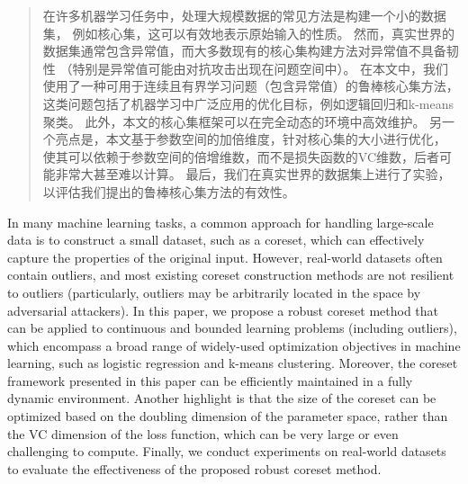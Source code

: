 

\begin{abstract}
  在许多机器学习任务中，处理大规模数据的常见方法是构建一个小的数据集，
  例如核心集，这可以有效地表示原始输入的性质。
  然而，真实世界的数据集通常包含异常值，而大多数现有的核心集构建方法对异常值不具备韧性
  （特别是异常值可能由对抗攻击出现在问题空间中）。
  在本文中，我们使用了一种可用于连续且有界学习问题（包含异常值）的鲁棒核心集方法，
  这类问题包括了机器学习中广泛应用的优化目标，例如逻辑回归和k-means聚类。
  此外，本文的核心集框架可以在完全动态的环境中高效维护。
  另一个亮点是，本文基于参数空间的加倍维度，针对核心集的大小进行优化，
  使其可以依赖于参数空间的倍增维数，而不是损失函数的VC维数，后者可能非常大甚至难以计算。
  最后，我们在真实世界的数据集上进行了实验，以评估我们提出的鲁棒核心集方法的有效性。
\end{abstract}

\begin{abstract*}
  In many machine learning tasks, a common approach for handling large-scale data is to construct a small dataset, 
  such as a coreset, which can effectively capture the properties of the original input. However, 
  real-world datasets often contain outliers, and most existing coreset construction methods 
  are not resilient to outliers (particularly, outliers may be arbitrarily located in the space by adversarial 
  attackers). In this paper, we propose a robust coreset method that can be applied to continuous and 
  bounded learning problems (including outliers), which encompass a broad range of widely-used optimization 
  objectives in machine learning, such as logistic regression and k-means clustering. Moreover, 
  the coreset framework presented in this paper can be efficiently maintained in a fully dynamic environment. 
  Another highlight is that the size of the coreset can be optimized based on the doubling dimension of the 
  parameter space, rather than the VC dimension of the loss function, which can be very large or even challenging 
  to compute. Finally, we conduct experiments on real-world datasets to evaluate the effectiveness of the 
  proposed robust coreset method.
\end{abstract*}
